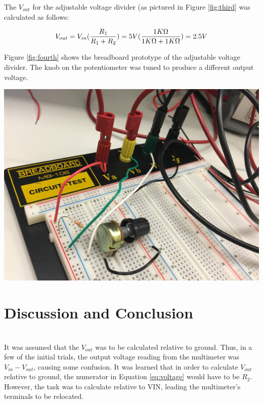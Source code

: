 \documentclass[journal]{IEEEtran}
\begin{document}
\noindent The $V_{out}$ for the adjustable voltage divider (as pictured in Figure \ref{fig:third} was calculated as follows:

\begin{equation}
V_{out} = V_{in} (\frac{R\textsubscript{1}}{R\textsubscript{1} + R\textsubscript{2}}) = 5V (\frac{1K\ohm}{1K\ohm + 1K\ohm}) = 2.5 V
\label{eq:adjustvout}
\end{equation}

\noindent Figure \ref{fig:fourth} shows the breadboard prototype of the adjustable voltage divider. The knob on the potentiometer was tuned to produce a different output voltage.

 \medskip

\begingroup
    \medskip
    \centering
    \includegraphics[width =\columnwidth]{images/lab1_4.jpg}
    \label{fig:fourth}
    \medskip
\endgroup

\section{Discussion and Conclusion}\\

\noindent It was assumed that the $V_{out}$ was to be calculated relative to ground. Thus, in a few of the initial trials, the output voltage reading from the multimeter was $V_{in} - V_{out}$, causing some confusion. It was learned that in order to calculate $V_{out}$ relative to ground, the numerator in Equation \ref{eq:voltage} would have to be $R_2$. However, the task was to calculate relative to VIN, leading the multimeter's terminals to be relocated. 






\printbibliography
\end{document}
